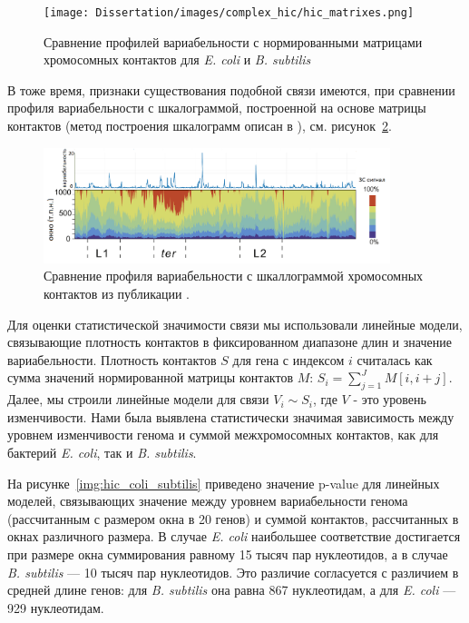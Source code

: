 \begin{figure}[!ht] 
  \center
    \texttt{[image: Dissertation/images/complex\_hic/hic\_matrixes.png]}
    \caption{Сравнение профилей вариабельности с нормированными матрицами хромосомных контактов для \textit{E. coli} и \textit{B. subtilis}}
    \label{img:hic_matrixes}
\end{figure}

В тоже время, признаки существования подобной связи имеются, при сравнении профиля вариабельности с шкалограммой, построенной на основе матрицы контактов (метод построения шкалограмм описан в \cite{lioy2018multiscale}), см. рисунок~\ref{img:scalogram_complexity_coli}.

\begin{figure}[!ht] 
  \center
    \includegraphics [width=0.9\textwidth] {Dissertation/images/complex_hic/hic_scalogram_complexity_coli.png}
    \caption{Сравнение профиля вариабельности с шкаллограммой хромосомных контактов из публикации \cite{lioy2018multiscale}.}
    \label{img:scalogram_complexity_coli}
\end{figure}

 Для оценки статистической значимости связи мы использовали линейные модели, связывающие плотность контактов в фиксированном диапазоне длин и значение вариабельности. Плотность контактов $S$ для гена с индексом $i$ считалась как сумма значений нормированной матрицы контактов $M$: $S_i = \sum_{j=1}^J M[i,i+j] $. Далее, мы строили линейные модели для связи $V_i \sim S_i$, где $V$ - это уровень изменчивости. Нами была выявлена статистически значимая зависимость между уровнем изменчивости генома и суммой межхромосомных контактов, как для бактерий \textit{E. coli}, так и \textit{B. subtilis}. 
 
 На рисунке~\ref{img:hic_coli_subtilis} приведено значение p-value для линейных моделей, связывающих значение между уровнем вариабельности генома (рассчитанным с размером окна в 20 генов) и суммой контактов, рассчитанных в окнах различного размера. В случае  \textit{E. coli} наибольшее соответствие достигается при размере окна суммирования равному 15 тысяч пар нуклеотидов, а в случае \textit{B. subtilis} --- 10 тысяч пар нуклеотидов. Это различие согласуется с различием в средней длине генов: для \textit{B. subtilis} она равна 867 нуклеотидам, а для \textit{E. coli} --- 929 нуклеотидам.

